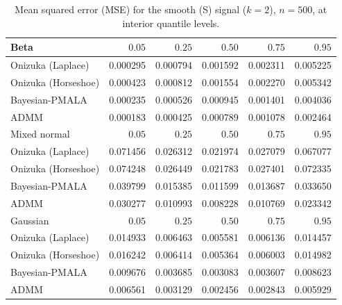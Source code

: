\begin{table}[!htbp]
\centering
\small
\caption{Mean squared error (MSE) for the smooth (S) signal ($k=2$), $n=500$, at interior quantile levels.}
\label{tab:s_int_mse}
\begin{tabular}{lrrrrr}
\toprule
Beta & $0.05$ & $0.25$ & $0.50$ & $0.75$ & $0.95$ \\
\midrule
Onizuka (Laplace) & 0.000295 & 0.000794 & 0.001592 & 0.002311 & 0.005225 \\
Onizuka (Horseshoe) & 0.000423 & 0.000812 & 0.001554 & 0.002270 & 0.005342 \\
Bayesian-PMALA & 0.000235 & 0.000526 & 0.000945 & 0.001401 & 0.004036 \\
ADMM & 0.000183 & 0.000425 & 0.000789 & 0.001078 & 0.002464 \\
\midrule
Mixed normal & $0.05$ & $0.25$ & $0.50$ & $0.75$ & $0.95$ \\
\midrule
Onizuka (Laplace) & 0.071456 & 0.026312 & 0.021974 & 0.027079 & 0.067077 \\
Onizuka (Horseshoe) & 0.074248 & 0.026449 & 0.021783 & 0.027401 & 0.072335 \\
Bayesian-PMALA & 0.039799 & 0.015385 & 0.011599 & 0.013687 & 0.033650 \\
ADMM & 0.030277 & 0.010993 & 0.008228 & 0.010769 & 0.023342 \\
\midrule
Gaussian & $0.05$ & $0.25$ & $0.50$ & $0.75$ & $0.95$ \\
\midrule
Onizuka (Laplace) & 0.014933 & 0.006463 & 0.005581 & 0.006136 & 0.014457 \\
Onizuka (Horseshoe) & 0.016242 & 0.006414 & 0.005364 & 0.006003 & 0.014982 \\
Bayesian-PMALA & 0.009676 & 0.003685 & 0.003083 & 0.003607 & 0.008623 \\
ADMM & 0.006561 & 0.003129 & 0.002456 & 0.002843 & 0.005929 \\
\bottomrule
\end{tabular}
\end{table}
